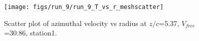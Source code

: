 \begin{figure}[H]
\centering
\texttt{[image: figs/run\_9/run\_9\_T\_vs\_r\_meshscatter]}
\caption{Scatter plot of azimuthal velocity vs radius at $z/c$=5.37, $V_{free}$=30.86, station1.}
\label{fig:run_9_T_vs_r_meshscatter}
\end{figure}


